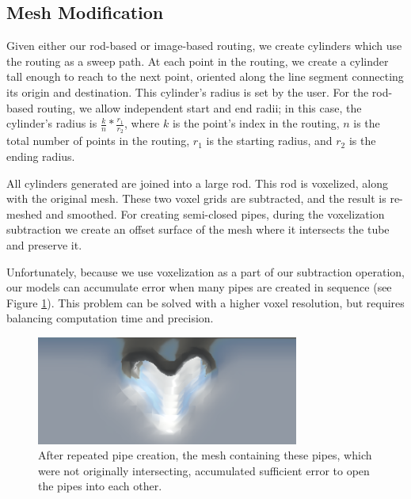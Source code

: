
\subsection{Mesh Modification}

Given either our rod-based or image-based routing, we create cylinders which use the routing as a sweep path.  At each point in the routing, we create a cylinder tall enough to reach to the next point, oriented along the line segment connecting its origin and destination.  This cylinder's radius is set by the user.  For the rod-based routing, we allow independent start and end radii; in this case, the cylinder's radius is $\frac{k}{n}*\frac{r_1}{r_2}$, where $k$ is the point's index in the routing, $n$ is the total number of points in the routing, $r_1$ is the starting radius, and $r_2$ is the ending radius.

All cylinders generated are joined into a large rod.  This rod is voxelized, along with the original mesh.  These two voxel grids are subtracted, and the result is re-meshed and smoothed.  For creating semi-closed pipes, during the voxelization subtraction we create an offset surface of the mesh where it intersects the tube and preserve it.

Unfortunately, because we use voxelization as a part of our subtraction operation, our models can accumulate error when many pipes are created in sequence (see Figure \ref{fig:voxelize}).  This problem can be solved with a higher voxel resolution, but requires balancing computation time and precision.

\begin{figure}[h!]
\centering
    \includegraphics[width=3.4in]{figures/voxelize-fail.png}
\caption{After repeated pipe creation, the mesh containing these pipes, which were not originally intersecting, accumulated sufficient error to open the pipes into each other. }
\label{fig:voxelize}
\end{figure}

